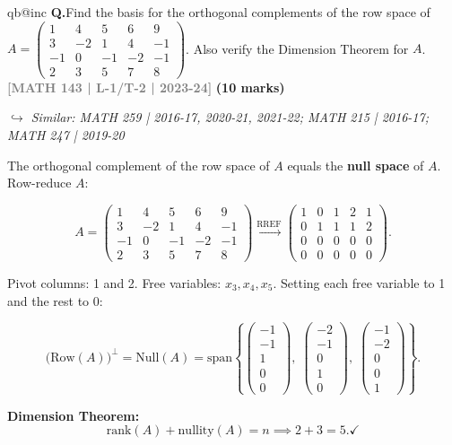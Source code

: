 \documentclass[12pt,a3paper]{article}
\makeatletter
\newcommand{\yr}[1]{\hfill\textcolor{gray}{\small\textbf{[#1]}}}
\newcommand{\mk}[1]{\textcolor{orange!70!black}{\small\textbf{(#1 marks)}}}
\newcommand{\variant}[1]{\par\vspace{1pt}\textcolor{blue!50!black}%
  {\footnotesize\textit{$\hookrightarrow$ Similar: #1}}}
\newcounter{qnum}
\newcommand{\Q}[1]{%
  \csname qb@inc\endcsname
  \needspace{4\baselineskip}
  \refstepcounter{qnum}
  \vspace{6pt}
  \noindent\textbf{Q\theqnum.}\enspace #1\par
}
\makeatother
\begin{document}
\Q{Find the basis for the orthogonal complements of the row space of \\$A = \begin{pmatrix} 1 & 4 & 5 & 6 & 9 \\ 3 & -2 & 1 & 4 & -1 \\ -1 & 0 & -1 & -2 & -1 \\ 2 & 3 & 5 & 7 & 8 \end{pmatrix}$. Also verify the Dimension Theorem for $A$.
\yr{MATH 143 | L-1/T-2 | 2023-24} \mk{10}
\variant{MATH 259 | 2016-17, 2020-21, 2021-22; MATH 215 | 2016-17; MATH 247 | 2019-20}}

\begin{tcolorbox}[enhanced,breakable,
  colback=cD!4,colframe=cD,boxrule=0.8pt,arc=5pt,
  title={\textbf{Answer --- Orthogonal Complement of Row Space \& Dimension Theorem}},
  fonttitle=\bfseries\color{white},colbacktitle=cD]

The orthogonal complement of the row space of $A$ equals the \textbf{null space} of $A$.
Row-reduce $A$:

\[
A = \begin{pmatrix}1&4&5&6&9\\3&-2&1&4&-1\\-1&0&-1&-2&-1\\2&3&5&7&8\end{pmatrix}
\xrightarrow{\text{RREF}}
\begin{pmatrix}1&0&1&2&1\\0&1&1&1&2\\0&0&0&0&0\\0&0&0&0&0\end{pmatrix}.
\]

Pivot columns: 1 and 2. Free variables: $x_3,x_4,x_5$.
Setting each free variable to 1 and the rest to 0:

\[
\bigl(\mathrm{Row}(A)\bigr)^\perp = \mathrm{Null}(A)
= \mathrm{span}\!\left\{
  \begin{pmatrix}-1\\-1\\1\\0\\0\end{pmatrix},\;
  \begin{pmatrix}-2\\-1\\0\\1\\0\end{pmatrix},\;
  \begin{pmatrix}-1\\-2\\0\\0\\1\end{pmatrix}
\right\}.
\]

\textbf{Dimension Theorem:}
\[
\mathrm{rank}(A) + \mathrm{nullity}(A) = n \implies 2 + 3 = 5. \checkmark
\]

\end{tcolorbox}
\end{document}
